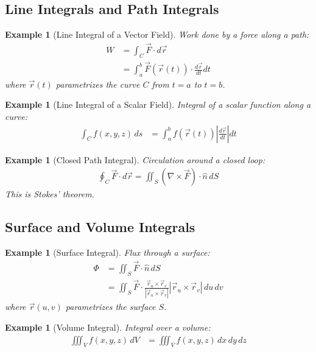 \documentclass{article}
\newtheorem{example}[theorem]{Example}
\begin{document}
\subsection{Line Integrals and Path Integrals}

\begin{example}[Line Integral of a Vector Field]
Work done by a force along a path:
\begin{align*}
    W &= \int_C \vec{F} \cdot d\vec{r} \\
    &= \int_a^b \vec{F}(\vec{r}(t)) \cdot \frac{d\vec{r}}{dt} dt
\end{align*}
where $\vec{r}(t)$ parametrizes the curve $C$ from $t=a$ to $t=b$.
\end{example}

\begin{example}[Line Integral of a Scalar Field]
Integral of a scalar function along a curve:
\begin{align*}
    \int_C f(x,y,z) \, ds &= \int_a^b f(\vec{r}(t)) \left|\frac{d\vec{r}}{dt}\right| dt
\end{align*}
\end{example}

\begin{example}[Closed Path Integral]
Circulation around a closed loop:
\begin{align*}
    \oint_C \vec{F} \cdot d\vec{r} = \iint_S (\nabla \times \vec{F}) \cdot \hat{n} \, dS
\end{align*}
This is Stokes' theorem.
\end{example}

\subsection{Surface and Volume Integrals}

\begin{example}[Surface Integral]
Flux through a surface:
\begin{align*}
    \Phi &= \iint_S \vec{F} \cdot \hat{n} \, dS \\
    &= \iint_S \vec{F} \cdot \frac{\vec{r}_u \times \vec{r}_v}{|\vec{r}_u \times \vec{r}_v|} |\vec{r}_u \times \vec{r}_v| \, du \, dv
\end{align*}
where $\vec{r}(u,v)$ parametrizes the surface $S$.
\end{example}

\begin{example}[Volume Integral]
Integral over a volume:
\begin{align*}
    \iiint_V f(x,y,z) \, dV &= \iiint_V f(x,y,z) \, dx \, dy \, dz
\end{align*}
\end{example}
\end{document}
